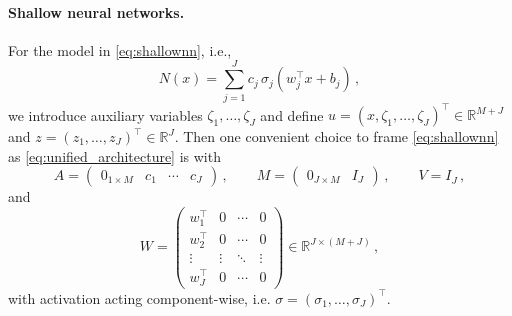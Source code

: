 \paragraph{Shallow neural networks.}
For the model in \eqref{eq:shallownn}, i.e.,
\begin{equation*}
    N(x)=\sum_{j=1}^{J} c_j\,\sigma_j(w_j^\top x+b_j) \, ,
\end{equation*}
we introduce auxiliary variables $\zeta_1,\ldots,\zeta_J$ and define $u=(x,\zeta_1,\ldots,\zeta_J)^\top\in\mathbb{R}^{M+J}$ and $z=(z_1,\ldots,z_J)^\top\in\mathbb{R}^{J}$. Then one convenient choice to frame \eqref{eq:shallownn} as \eqref{eq:unified_architecture} is with
\begin{equation*}
    A=\begin{pmatrix}0_{1\times M}&c_1&\cdots&c_J\end{pmatrix} \, , \qquad
    M=\begin{pmatrix}0_{J\times M}&I_J\end{pmatrix} \, , \qquad
    V=I_J \, ,
\end{equation*}
and
\begin{equation*}
    W=
    \begin{pmatrix}
        w_1^\top & 0 & \cdots & 0\\
        w_2^\top & 0 & \cdots & 0\\
        \vdots & \vdots & \ddots & \vdots\\
        w_J^\top & 0 & \cdots & 0
    \end{pmatrix}
    \in \mathbb{R}^{J\times(M+J)} \, ,
\end{equation*}
with activation acting component-wise, i.e. $\sigma=(\sigma_1,\ldots,\sigma_J)^\top$.

